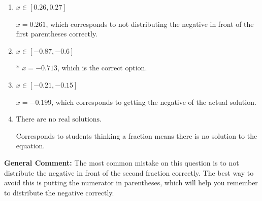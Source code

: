 \documentclass{extbook}[14pt]
\begin{document}
\begin{enumerate}
{\begin{enumerate}[label=\Alph*.]
$x = -0.261$, which corresponds to not distributing the negative in front of the second parentheses correctly.
\item \( x \in [0.26, 0.27] \)

$x = 0.261$, which corresponds to not distributing the negative in front of the first parentheses correctly.
\item \( x \in [-0.87, -0.6] \)

* $x = -0.713$, which is the correct option.
\item \( x \in [-0.21, -0.15] \)

$x = -0.199$, which corresponds to getting the negative of the actual solution.
\item \( \text{There are no real solutions.} \)

Corresponds to students thinking a fraction means there is no solution to the equation.
\end{enumerate}

\textbf{General Comment:} The most common mistake on this question is to not distribute the negative in front of the second fraction correctly. The best way to avoid this is putting the numerator in parentheses, which will help you remember to distribute the negative correctly.
}
\end{enumerate}
\end{document}
